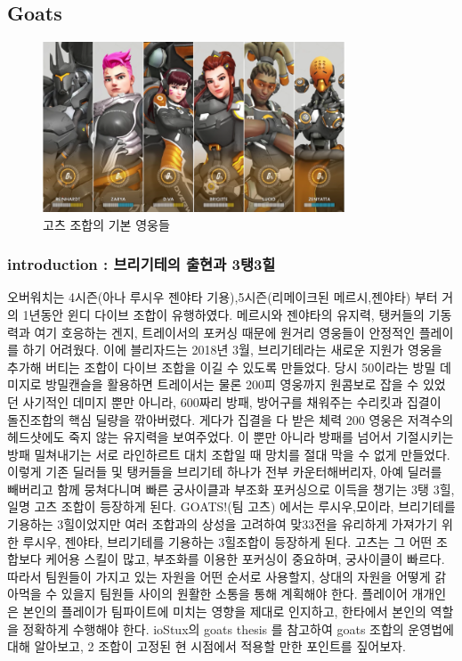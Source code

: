 \subsection{Goats}
\begin{figure}[htp]
    \centering
    \includegraphics[width=0.8\textwidth]{figures/goats.png}
    \caption{고츠 조합의 기본 영웅들}
    \label{fig:goats}
\end{figure}
\subsubsection{introduction : 브리기테의 출현과 3탱3힐}\label{goats:intro}
오버워치는 4시즌(아나 루시우 젠야타 기용),5시즌(리메이크된 메르시,젠야타) 부터 거의 1년동안 윈디 다이브 조합이 유행하였다. 메르시와 젠야타의 유지력, 탱커들의 기동력과 여기 호응하는 겐지, 트레이서의 포커싱 때문에 원거리 영웅들이 안정적인 플레이를 하기 어려웠다. 이에 블리자드는 2018년 3월, 브리기테라는 새로운 지원가 영웅을 추가해 버티는 조합이 다이브 조합을 이길 수 있도록 만들었다. 당시 50이라는 방밀 데미지로 방밀캔슬을 활용하면 트레이서는 물론 200피 영웅까지 원콤보로 잡을 수 있었던 사기적인 데미지 뿐만 아니라, 600짜리 방패, 방어구를 채워주는 수리킷과 집결이 돌진조합의 핵심 딜량을 깎아버렸다. 게다가 집결을 다 받은 체력 200 영웅은 저격수의 헤드샷에도 죽지 않는 유지력을 보여주었다. 이 뿐만 아니라 방패를 넘어서 기절시키는 방패 밀쳐내기는 서로 라인하르트 대치 조합일 때 망치를 절대 막을 수 없게 만들었다.
이렇게 기존 딜러들 및 탱커들을 브리기테 하나가 전부 카운터해버리자, 아예 딜러를 빼버리고 함께 뭉쳐다니며 빠른 궁사이클과 부조화 포커싱으로 이득을 챙기는 3탱 3힐, 일명 고츠 조합이 등장하게 된다. GOATS!(팀 고츠) 에서는 루시우,모이라, 브리기테를 기용하는 3힐이었지만 여러 조합과의 상성을 고려하여 맞33전을 유리하게 가져가기 위한 루시우, 젠야타, 브리기테를 기용하는 3힐조합이 등장하게 된다.
고츠는 그 어떤 조합보다 케어용 스킬이 많고, 부조화를 이용한 포커싱이 중요하며, 궁사이클이 빠르다. 따라서 팀원들이 가지고 있는 자원을 어떤 순서로 사용할지, 상대의 자원을 어떻게 갉아먹을 수 있을지 팀원들 사이의 원활한 소통을 통해 계획해야 한다. 플레이어 개개인은 본인의 플레이가 팀파이트에 미치는 영향을 제대로 인지하고, 한타에서 본인의 역할을 정확하게 수행해야 한다. ioStux의 goats thesis\cite{ioStux} 를 참고하여 goats 조합의 운영법에 대해 알아보고, 2 조합이 고정된 현 시점에서 적용할 만한 포인트를 짚어보자.
